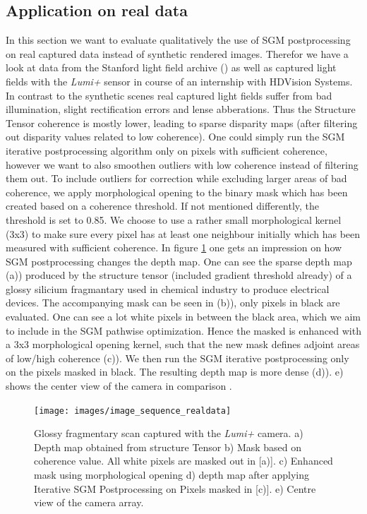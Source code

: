 \documentclass  [
  paper    = a4,
  BCOR     = 10mm,
  twoside,
  fontsize = 12pt,
  fleqn,
  toc      = bibnumbered,
  toc      = listofnumbered,
  numbers  = noendperiod,
  headings = normal,
  listof   = leveldown,
  version  = 3.03
]                                       {scrreprt}
\begin{document}
\subsection{Application on real data}
\label{realdata}
In this section we want to evaluate qualitatively the use of SGM postprocessing on real captured data instead of synthetic rendered images. Therefor we have a look at data from the Stanford light field archive (\cite{wiburn2004high}) as well as captured light fields with the \textit{Lumi+} sensor in course of an internship with HDVision Systems. In contrast to the synthetic scenes real captured light fields suffer from bad illumination, slight rectification errors and lense abberations. Thus the Structure Tensor coherence is mostly lower, leading to sparse disparity maps (after filtering out disparity values related to low coherence). One could simply run the SGM iterative postprocessing algorithm only on pixels with sufficient coherence, however we want to also smoothen outliers with low coherence instead of filtering them out. To include outliers for correction while excluding larger areas of bad coherence, we apply morphological opening to the binary mask which has been created based on a coherence threshold. If not mentioned differently, the threshold is set to 0.85. We choose to use a rather small morphological kernel (3x3) to make sure every pixel has at least one neighbour initially which has been measured with sufficient coherence. In figure \ref{fig:imagesequencerealdata} one gets an impression on how SGM postprocessing changes the depth map. One can see the sparse depth map (a)) produced by the structure tensor (included gradient threshold already) of a glossy silicium fragmantary used in chemical industry to produce electrical devices. The accompanying mask can be seen in (b)), only pixels in black are evaluated. One can see a lot white pixels in between the black area, which we aim to include in the SGM pathwise optimization. Hence the masked is enhanced with a 3x3 morphological opening kernel, such that the new mask defines adjoint areas of low/high coherence (c)). We then run the SGM iterative postprocessing only on the pixels masked in black. The resulting depth map is more dense (d)). e) shows the center view of the camera in comparison .

\begin{figure}
	\centering
	\texttt{[image: images/image\_sequence\_realdata]}
	\caption[Silicium Scan with iterative SGM]{Glossy fragmentary scan captured with the \textit{Lumi+} camera. a) Depth map obtained from structure Tensor b) Mask based on coherence value. All white pixels are masked out in [a)]. c) Enhanced mask using morphological opening d) depth map after applying Iterative SGM Postprocessing  on Pixels masked in [c)]. e) Centre view of the camera array.}
	\label{fig:imagesequencerealdata}
\end{figure}
\end{document}

